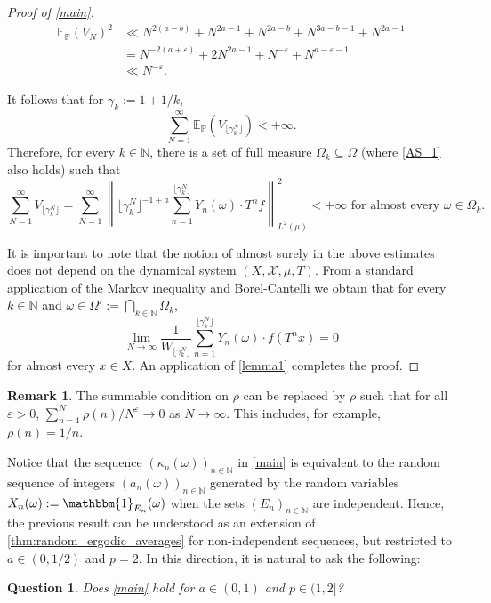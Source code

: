\documentclass[11pt]{amsart}
\numberwithin{equation}{section}
\newtheorem{question}{Question}
\theoremstyle{definition}
\newtheorem{remark}{Remark}
\theoremstyle{plain}
\newcommand{\E}{{\mathbb E}}
\newcommand{\N}{{\mathbb N}}
\renewcommand{\P}{{\mathbb P}}
\begin{document}
\begin{proof}[Proof of \cref{main}]
\begin{equation}
\begin{split}
     \E_{\P}(V_N)^2&\ll N^{2(a-b)}+N^{2a-1}+N^{2a-b}+N^{3a-b-1}+N^{2a-1}\\
    &= N^{-2(a+\varepsilon)}+2N^{2a-1}+N^{-\varepsilon}+N^{a-\varepsilon-1}\\
    &\ll N^{-\varepsilon}.\label{final_estimation}
\end{split}   
\end{equation}


It follows that for $\gamma_k:=1+1/k$, $$\sum_{N=1}^\infty \mathbb{E}_{\mathbb{P}}(V_{\lfloor\gamma_k^N\rfloor})<+\infty.$$ 
Therefore, for every $k\in \N$, there is a set of full measure $\Omega_k\subseteq \Omega$ (where \eqref{AS_1} also holds) such that
$$\sum_{N=1}^\infty V_{\lfloor\gamma_k^N\rfloor}=\sum_{N=1}^\infty\left\|\lfloor\gamma_k^N\rfloor^{-1+a}\sum_{n=1}^{\lfloor\gamma_k^N\rfloor} Y_n(\omega)\cdot T^{n}f \right\|^2_{L^2(\mu)}<+\infty \text{ for almost every $\omega\in \Omega_k$}.$$

It is important to note that the notion of almost surely in the above estimates does not depend on the dynamical system $(X,\mathcal{X},\mu,T)$. From a standard application of the Markov inequality and Borel-Cantelli we obtain that for every $k\in \N$ and $\omega\in \Omega':=\bigcap_{k\in\N} \Omega_k$,
\[\lim_{N\to \infty}\dfrac{1}{W_{\lfloor\gamma_k^N\rfloor}}\sum_{n=1}^{\lfloor\gamma_k^N\rfloor} Y_n(\omega)\cdot f(T^{n}x)=0 \]
for almost every $x\in X$. An application of \cref{lemma1} completes the proof.
\end{proof}

\begin{remark}
The summable condition on $\rho$  can be replaced by $\rho$ such that for all $\varepsilon>0$, $\sum_{n=1}^N\rho(n)/N^\varepsilon\to 0$ as $N\to \infty$. This includes, for example, $\rho(n)=1/n$.
\end{remark}
Notice that the sequence $(\kappa_{n}(\omega))_{n\in\N}$ in \cref{main} is equivalent to 
the random sequence of integers $(a_n(\omega))_{n\in\N}$ generated by the random variables $X_n(\omega):=\mathbbm{1}_{E_n}(\omega)$ when the sets $(E_n)_{n\in \N}$ are independent. Hence, the previous result can be understood as an extension of \cref{thm:random_ergodic_averages} for non-independent sequences, but restricted to $a\in (0,1/2)$ and $p=2$. In this direction, it is natural to ask the following:

\begin{question} Does \cref{main} hold for $a\in (0,1)$ and $p\in (1,2]$?    
\end{question}
\end{document}
